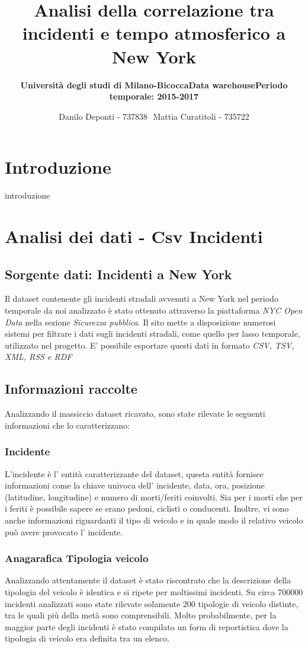 \documentclass[12pt, a4paper]{scrartcl}
\subtitle{\textbf{Università degli studi di Milano-Bicocca}}
\subtitle{\textbf{Data warehouse}}
\title{\textbf{Analisi della correlazione tra incidenti e tempo atmosferico a New York}}
\subtitle{\textbf{Periodo temporale: 2015-2017}}
\author{Danilo Deponti - 737838 $    $ Mattia Curatitoli - 735722} \date{}
\begin{document}
\maketitle
 
\section*{Introduzione}
introduzione

\section*{Analisi dei dati - Csv Incidenti}

\subsection*{Sorgente dati: Incidenti a New York}
Il dataset contenente gli incidenti stradali avvenuti a New York nel periodo temporale da noi analizzato è stato ottenuto attraverso la piattaforma \emph{NYC Open Data} nella sezione \emph{Sicurezza pubblica}.
Il sito mette a disposizione numerosi sistemi per filtrare i dati sugli incidenti stradali, come quello per lasso temporale, utilizzato nel progetto. E' possibile esportare questi dati in formato \emph{CSV, TSV, XML, RSS e RDF}
\subsection*{Informazioni raccolte}
Analizzando il massiccio dataset ricavato, sono state rilevate le seguenti informazioni che lo caratterizzano:
\subsubsection*{Incidente}
L'incidente è l' entità caratterizzante del dataset, questa entità fornisce informazioni come la chiave univoca dell' incidente, data, ora, posizione (latitudine, longitudine) e numero di morti/feriti coinvolti.
Sia per i morti che per i feriti è possibile sapere se erano pedoni, ciclisti o conducenti.
Inoltre, vi sono anche informazioni riguardanti il tipo di veicolo e in quale modo il relativo veicolo può avere provocato l' incidente.
\subsubsection*{Anagarafica Tipologia veicolo}
Analizzando attentamente il dataset è stato riscontrato che la descrizione della tipologia del veicolo è identica e si ripete per moltissimi incidenti. Su circa 700000 incidenti analizzati sono state rilevate solamente 200 tipologie di veicolo distinte, tra le quali più della metà sono comprensibili. Molto probabilmente, per la maggior parte degli incidenti è stato compilato un form di reportistica dove la tipologia di veicolo era definita tra un elenco. 
\end{document}
